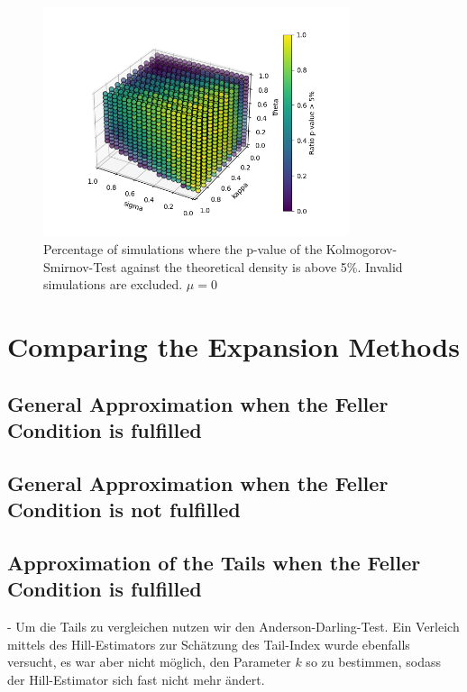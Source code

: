 \begin{figure}
    \centering
    \includegraphics[width=0.8\textwidth]{img/GC_cum_KS_3d_p_value_sigma_kappa_theta_muzero.png}
    \caption{Percentage of simulations where the p-value of the Kolmogorov-Smirnov-Test against the theoretical density is above 5\%. Invalid simulations are excluded. $\mu=0$}
    \label{fig:GC_cum_KS_3d_p_value_sigma_kappa_theta_muzero}
\end{figure}

\section{Comparing the Expansion Methods}

\subsection{General Approximation when the Feller Condition is fulfilled}

\subsection{General Approximation when the Feller Condition is not fulfilled}

\subsection{Approximation of the Tails when the Feller Condition is fulfilled}
- Um die Tails zu vergleichen nutzen wir den Anderson-Darling-Test. Ein Verleich mittels des Hill-Estimators zur Schätzung des Tail-Index wurde ebenfalls versucht, es war aber nicht möglich, den Parameter $k$ so zu bestimmen, sodass der Hill-Estimator sich fast nicht mehr ändert. 

